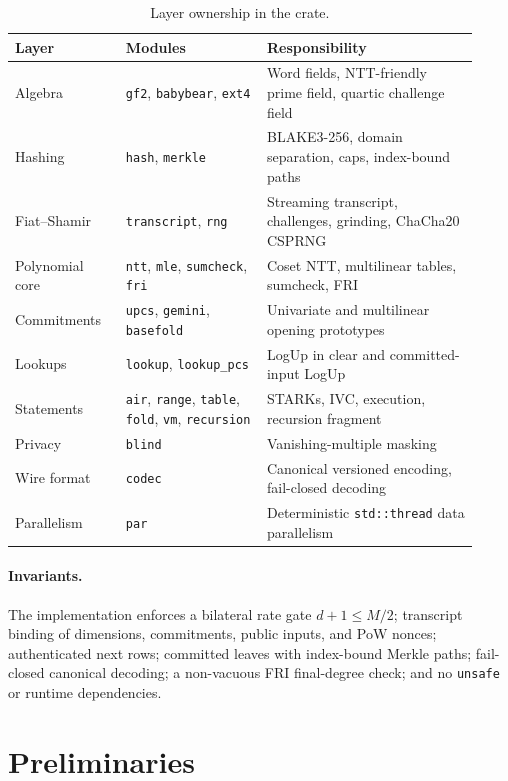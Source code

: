 \documentclass[11pt,a4paper]{article}
\begin{document}
\begin{table}[h]
\centering
\small
\begin{tabular}{@{}p{0.22\linewidth}p{0.28\linewidth}p{0.42\linewidth}@{}}
\toprule
Layer & Modules & Responsibility \\
\midrule
Algebra & \texttt{gf2}, \texttt{babybear}, \texttt{ext4} & Word fields, NTT-friendly prime field, quartic challenge field \\
Hashing & \texttt{hash}, \texttt{merkle} & BLAKE3-256, domain separation, caps, index-bound paths \\
Fiat--Shamir & \texttt{transcript}, \texttt{rng} & Streaming transcript, challenges, grinding, ChaCha20 CSPRNG \\
Polynomial core & \texttt{ntt}, \texttt{mle}, \texttt{sumcheck}, \texttt{fri} & Coset NTT, multilinear tables, sumcheck, FRI \\
Commitments & \texttt{upcs}, \texttt{gemini}, \texttt{basefold} & Univariate and multilinear opening prototypes \\
Lookups & \texttt{lookup}, \texttt{lookup\_pcs} & LogUp in clear and committed-input LogUp \\
Statements & \texttt{air}, \texttt{range}, \texttt{table}, \texttt{fold}, \texttt{vm}, \texttt{recursion} & STARKs, IVC, execution, recursion fragment \\
Privacy & \texttt{blind} & Vanishing-multiple masking \\
Wire format & \texttt{codec} & Canonical versioned encoding, fail-closed decoding \\
Parallelism & \texttt{par} & Deterministic \texttt{std::thread} data parallelism \\
\bottomrule
\end{tabular}
\caption{Layer ownership in the crate.}
\end{table}

\paragraph{Invariants.} The implementation enforces a bilateral rate gate
$d+1 \le M/2$; transcript binding of dimensions, commitments, public inputs,
and PoW nonces; authenticated next rows; committed leaves with index-bound
Merkle paths; fail-closed canonical decoding; a non-vacuous FRI final-degree
check; and no \texttt{unsafe} or runtime dependencies.

\section{Preliminaries}
\end{document}

